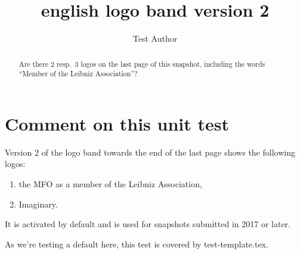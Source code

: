 \documentclass{snapshotmfo}
\author{Test Author}
\title{english logo band version 2}
\begin{document}
\begin{abstract}
Are there 2 resp.\ 3 logos on the last page of this snapshot, including the words ``Member of the Leibniz Association''?
\end{abstract}

\section{Comment on this unit test}
Version 2 of the logo band towards the end of the last page shows the following logos:
\begin{enumerate}
  \item the MFO as a member of the Leibniz Association,
  \item Imaginary.
\end{enumerate}
It is activated by default 
and is used for snapshots submitted in 2017 or later.

As we're testing a default here, this test is covered by test-template.tex.
\end{document}
